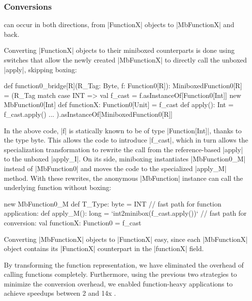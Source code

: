 \subsubsection{Conversions} can occur in both directions, from |FunctionX| objects to |MbFunctionX| and back.

Converting |FunctionX| objects to their miniboxed counterparts is done using switches that allow the newly created |MbFunctionX| to directly call the unboxed |apply|, skipping boxing:

\begin{lstlisting-nobreak}
 def function0_bridge[R](R_Tag: Byte, f: Function0[R]): MiniboxedFunction0[R] =
   (R_Tag match {
     case INT =>
       val f_cast = f.asInstanceOf[Function0[Int]]
       new MbFunction0[Int] {
         def functionX: Function0[Unit] = f_cast
         def apply(): Int = f_cast.apply()
       }
     ...
   }).asInstanceOf[MiniboxedFunction0[R]]
\end{lstlisting-nobreak}

In the above code, |f| is statically known to be of type |Function[Int]|, thanks to the type byte. This allows the code to introduce |f_cast|, which in turn allows the specialization transformation to rewrite the call from the reference-based |apply| to the unboxed |apply_I|. On its side, miniboxing instantiates |MbFunction0_M| instead of |MbFunction0| and moves the code to the specialized |apply_M| method. With these rewrites, the anonymous |MbFunction| instance can call the underlying function without boxing:

\begin{lstlisting-nobreak}
   new MbFunction0_M {
     def T_Type: byte = INT
     // fast path for function application:
     def apply_M(): long = `int2minibox(f_cast.apply())`
     // fast path for conversion:
     val functionX: Function0 = f_cast
   }
\end{lstlisting-nobreak}

Converting |MbFunctionX| objects to |FunctionX| easy, since each |MbFunctionX| object contains its |FunctionX| counterpart in the |functionX| field.

By transforming the function representation, we have eliminated the overhead of calling functions completely. Furthermore, using the previous two strategies to minimize the conversion overhead, we enabled function-heavy applications to achieve speedups between 2 and 14x \cite{ildl-tech, ildl-plugin-wiki}. 